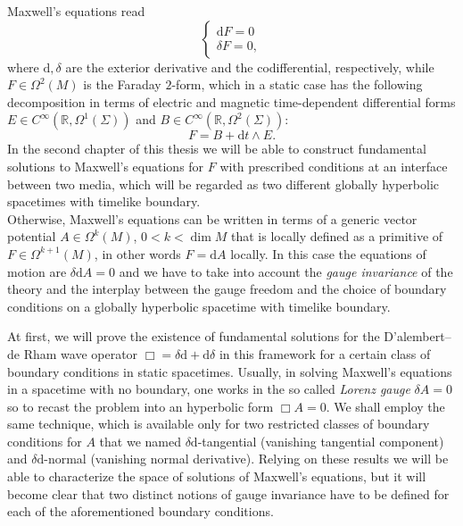 Maxwell's equations read
\begin{equation}
\begin{cases}
\mathrm{d} F=0\\
\delta F=0,
\end{cases}
\end{equation} 
where $\mathrm{d},\delta$ are the exterior derivative and the codifferential, respectively, while $F\in\Omega^2({M})$ is the Faraday $2$-form, which in a {static} case has the following decomposition in terms of electric and magnetic time-dependent differential forms $E\in C^\infty(\mathbb{R},\Omega^1(\Sigma))$ and $B\in C^\infty(\mathbb{R},\Omega^2(\Sigma))$:
\begin{equation}
F=B+\mathrm{d} t\wedge E.
\end{equation}
In the second chapter of this thesis we will be able to construct fundamental solutions to Maxwell's equations for $F$ with prescribed conditions at an interface between two media, which will be regarded as two different globally hyperbolic spacetimes with timelike boundary.\\

Otherwise, Maxwell's equations can be written in terms of a generic vector potential $A\in\Omega^k(M)$, $0<k<\dim M$ that is locally defined as a primitive of $F\in\Omega^{k+1}(M)$, in other words $F=\mathrm{d} A$ locally. In this case the equations of motion are $\delta\mathrm{d}A=0$ and we have to take into account the \emph{gauge invariance} of the theory and the interplay between the gauge freedom and the choice of boundary conditions on a globally hyperbolic spacetime with timelike boundary.

At first, we will prove the existence of fundamental solutions for the D'alembert--de Rham wave operator $\Box=\delta\mathrm{d}+\mathrm{d}\delta$ in this framework for a certain class of boundary conditions in static spacetimes. Usually, in solving Maxwell's equations in a spacetime with no boundary, one works in the so called \emph{Lorenz gauge} $\delta A=0$ so to recast the problem into an hyperbolic form $\Box A=0$. We shall employ the same technique, which is available only for two restricted classes of boundary conditions for $A$ that we named $\delta\mathrm{d}$-tangential (vanishing tangential component) and $\delta\mathrm{d}$-normal (vanishing normal derivative). Relying on these results we will be able to characterize the space of solutions of Maxwell's equations, but it will become clear that two distinct notions of gauge invariance have to be defined for each of the aforementioned boundary conditions.\\

